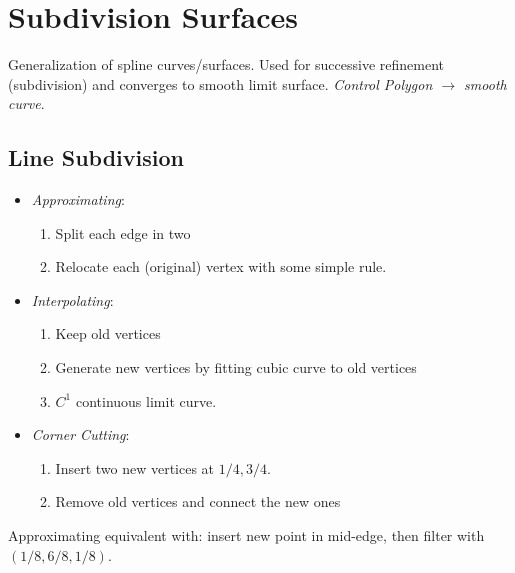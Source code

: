 \section{Subdivision Surfaces}
Generalization of spline curves/surfaces. Used for successive refinement (subdivision) and converges to smooth limit surface. \textit{Control Polygon \(\to\) smooth curve}.

\subsection{Line Subdivision}

\begin{definition}
  \begin{itemize}
    \item \textit{Approximating}: \begin{enumerate}
      \item Split each edge in two
      \item Relocate each (original) vertex with some simple rule.
    \end{enumerate}

    \item \textit{Interpolating}: \begin{enumerate}
      \item Keep old vertices
      \item Generate new vertices by fitting cubic curve to old vertices
      \item \(C^1\) continuous limit curve.
    \end{enumerate}

    \item \textit{Corner Cutting}: \begin{enumerate}
      \item Insert two new vertices at \(1/4, 3/4\).
      \item Remove old vertices and connect the new ones
    \end{enumerate}
  \end{itemize}
\end{definition}

\begin{definition}
  Approximating equivalent with: insert new point in mid-edge, then filter with \((1/8, 6/8, 1/8)\).
\end{definition}

